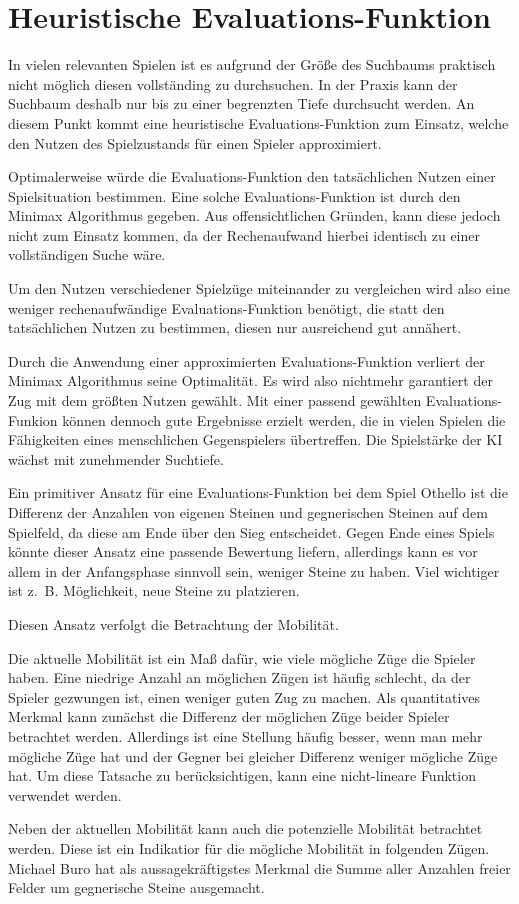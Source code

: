 \section{Heuristische Evaluations-Funktion}

In vielen relevanten Spielen ist es aufgrund der Größe des Suchbaums praktisch nicht möglich diesen vollständing zu
durchsuchen. In der Praxis kann der Suchbaum deshalb nur bis zu einer begrenzten Tiefe durchsucht werden. An diesem
Punkt kommt eine heuristische Evaluations-Funktion zum Einsatz, welche den Nutzen des Spielzustands für einen Spieler
approximiert.
\cite[S.~171]{ai2010russel}

Optimalerweise würde die Evaluations-Funktion den tatsächlichen Nutzen einer Spielsituation bestimmen. Eine solche
Evaluations-Funktion ist durch den Minimax Algorithmus gegeben. Aus offensichtlichen Gründen, kann diese jedoch nicht
zum Einsatz kommen, da der Rechenaufwand hierbei identisch zu einer vollständigen Suche wäre.

Um den Nutzen verschiedener Spielzüge miteinander zu vergleichen wird also eine weniger rechenaufwändige
Evaluations-Funktion benötigt, die statt den tatsächlichen Nutzen zu bestimmen, diesen nur ausreichend gut annähert.

Durch die Anwendung einer approximierten Evaluations-Funktion verliert der Minimax Algorithmus seine Optimalität. Es
wird also nichtmehr garantiert der Zug mit dem größten Nutzen gewählt. Mit einer passend gewählten Evaluations-Funkion
können dennoch gute Ergebnisse erzielt werden, die in vielen Spielen die Fähigkeiten eines menschlichen Gegenspielers
übertreffen. Die Spielstärke der KI wächst mit zunehmender Suchtiefe.


Ein primitiver Ansatz für eine Evaluations-Funktion bei dem Spiel Othello ist die Differenz der Anzahlen von eigenen
Steinen und gegnerischen Steinen auf dem Spielfeld, da diese am Ende über den Sieg entscheidet. Gegen Ende eines Spiels
könnte dieser Ansatz eine passende Bewertung liefern, allerdings kann es vor allem in der Anfangsphase sinnvoll sein,
weniger Steine zu haben. Viel wichtiger ist z. B. Möglichkeit, neue Steine zu platzieren.

Diesen Ansatz verfolgt die Betrachtung der Mobilität.

Die aktuelle Mobilität ist ein Maß dafür, wie viele mögliche Züge die Spieler haben. Eine niedrige Anzahl an möglichen
Zügen ist häufig schlecht, da der Spieler gezwungen ist, einen weniger guten Zug zu machen. Als quantitatives Merkmal
kann zunächst die Differenz der möglichen Züge beider Spieler betrachtet werden. Allerdings ist eine Stellung häufig
besser, wenn man mehr mögliche Züge hat und der Gegner bei gleicher Differenz weniger mögliche Züge hat. Um diese
Tatsache zu berücksichtigen, kann eine nicht-lineare Funktion verwendet werden.
\cite[S. 7]{evaluationfunctions}

Neben der aktuellen Mobilität kann auch die potenzielle Mobilität betrachtet werden. Diese ist ein Indikatior für die
mögliche Mobilität in folgenden Zügen. Michael Buro hat als aussagekräftigstes Merkmal die Summe aller Anzahlen freier
Felder um gegnerische Steine ausgemacht.
\cite[S. 8f.]{evaluationfunctions}

